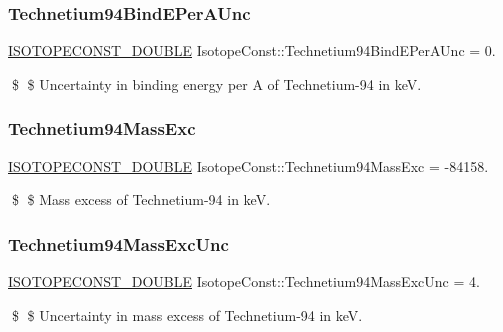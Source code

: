 \subsubsection{\texorpdfstring{Technetium94\+Bind\+E\+Per\+A\+Unc}{Technetium94BindEPerAUnc}}
{\footnotesize\ttfamily \mbox{\hyperlink{group___isotope_const-_macros_ga8f45a7272ce02c0b4c65c44636ed719a}{I\+S\+O\+T\+O\+P\+E\+C\+O\+N\+S\+T\+\_\+\+D\+O\+U\+B\+LE}} Isotope\+Const\+::\+Technetium94\+Bind\+E\+Per\+A\+Unc = 0.}

\$ \$ Uncertainty in binding energy per A of Technetium-\/94 in keV. \mbox{\label{group___isotope_const-_technetium-_tc94_ga36bbe866e0dd091b8cd64563b8cb890f}} 
\subsubsection{\texorpdfstring{Technetium94\+Mass\+Exc}{Technetium94MassExc}}
{\footnotesize\ttfamily \mbox{\hyperlink{group___isotope_const-_macros_ga8f45a7272ce02c0b4c65c44636ed719a}{I\+S\+O\+T\+O\+P\+E\+C\+O\+N\+S\+T\+\_\+\+D\+O\+U\+B\+LE}} Isotope\+Const\+::\+Technetium94\+Mass\+Exc = -\/84158.}

\$ \$ Mass excess of Technetium-\/94 in keV. \mbox{\label{group___isotope_const-_technetium-_tc94_ga701b3a04e6844a1652d8b0352451c7ba}} 
\subsubsection{\texorpdfstring{Technetium94\+Mass\+Exc\+Unc}{Technetium94MassExcUnc}}
{\footnotesize\ttfamily \mbox{\hyperlink{group___isotope_const-_macros_ga8f45a7272ce02c0b4c65c44636ed719a}{I\+S\+O\+T\+O\+P\+E\+C\+O\+N\+S\+T\+\_\+\+D\+O\+U\+B\+LE}} Isotope\+Const\+::\+Technetium94\+Mass\+Exc\+Unc = 4.}

\$ \$ Uncertainty in mass excess of Technetium-\/94 in keV. \mbox{\label{group___isotope_const-_technetium-_tc94_gaf1a8fa77cbbb43515ccc400b879eac49}} 
